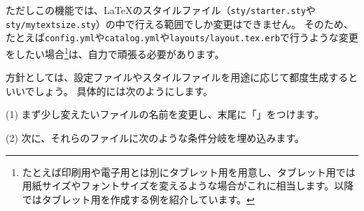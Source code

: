 ただしこの機能では、\LaTeX{}のスタイルファイル（\texttt{sty/starter.sty}や\texttt{sty/mytextsize.sty}）の中で行える範囲でしか変更はできません。
そのため、たとえば\texttt{config.yml}や\texttt{catalog.yml}や\texttt{layouts/layout.tex.erb}で行うような変更をしたい場合\footnote{たとえば印刷用や電子用とは別にタブレット用を用意し、タブレット用では用紙サイズやフォントサイズを変えるような場合がこれに相当します。以降ではタブレット用を作成する例を紹介しています。}は、自力で頑張る必要があります。

方針としては、設定ファイルやスタイルファイルを用途に応じて都度生成するといいでしょう。
具体的には次のようにします。

\vspace*{\baselineskip}
\noindent
(1) まず少し変えたいファイルの名前を変更し、末尾に「」をつけます。

\begin{starterterminal}\end{starterterminal}
\noindent
(2) 次に、それらのファイルに次のような条件分岐を埋め込みます。

